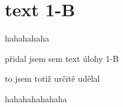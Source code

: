 \documentclass[crop=false]{standalone}
\begin{document}
\section*{text 1-B}
hahahahaha

přidal jsem sem text úlohy 1-B

to jsem totiž určitě udělal

hahahahahahaha
\end{document}
